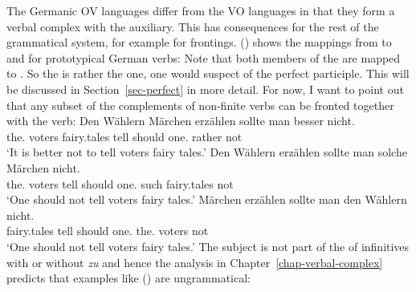The Germanic OV languages differ from the VO languages in that they form a verbal complex with the
auxiliary. This has consequences for the rest of the grammatical system, for example for
frontings. () shows the mappings from \argst to \spr and \comps for prototypical German verbs:
\ea
\label{partizipien-hm-zwei}%
\z
Note that both members of the \argstl are mapped to \comps. So the \compsv is rather the one, one
would suspect of the perfect participle. This will be discussed in Section~\ref{sec-perfect} in more detail.
For now, I want to point out that any subset of the complements of non-finite verbs can be fronted
together with the verb:
\eal
\ex 
\gll Den        Wählern Märchen erzählen sollte man besser nicht.\\
     the.\DAT{} voters fairy.tales tell should one.\NOM{} rather not\\
\glt `It is better not to tell voters fairy tales.'
\ex 
\gll Den        Wählern erzählen sollte man solche Märchen     nicht.\\
     the.\DAT{} voters  tell     should one.\NOM{} such   fairy.tales not\\
\glt `One should not tell voters fairy tales.'
\ex 
\gll Märchen     erzählen sollte man den        Wählern nicht.\\
     fairy.tales tell     should one.\NOM{} the.\DAT{} voters   not\\
\glt `One should not tell voters fairy tales.'
\zl
The subject is not part of the \compsl of infinitives with or without \emph{zu} and hence the
analysis in Chapter~\ref{chap-verbal-complex} predicts that examples like () are
ungrammatical:
\eal
{}
